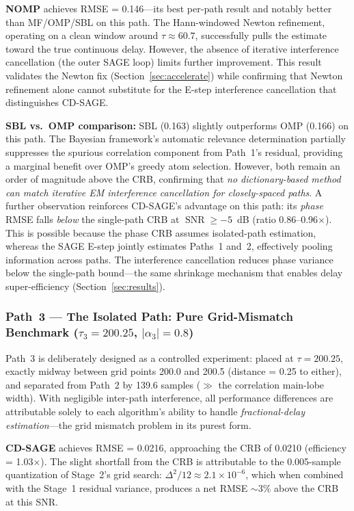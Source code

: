 \documentclass[a4paper,fleqn]{cas-dc}
\DeclareMathOperator{\SNR}{SNR}
\begin{document}
\textbf{NOMP} achieves RMSE = 0.146---its best per-path result and notably better than MF/OMP/SBL on this path. The Hann-windowed Newton refinement, operating on a clean window around $\tau \approx 60.7$, successfully pulls the estimate toward the true continuous delay. However, the absence of iterative interference cancellation (the outer SAGE loop) limits further improvement. This result validates the Newton fix (Section~\ref{sec:accelerate}) while confirming that Newton refinement alone cannot substitute for the E-step interference cancellation that distinguishes CD-SAGE.

\textbf{SBL vs.\ OMP comparison:} SBL (0.163) slightly outperforms OMP (0.166) on this path. The Bayesian framework's automatic relevance determination partially suppresses the spurious correlation component from Path~1's residual, providing a marginal benefit over OMP's greedy atom selection. However, both remain an order of magnitude above the CRB, confirming that \textit{no dictionary-based method can match iterative EM interference cancellation for closely-spaced paths}. A further observation reinforces CD-SAGE's advantage on this path: its \textit{phase} RMSE falls \textit{below} the single-path CRB at $\SNR \ge -5$~dB (ratio 0.86--0.96$\times$). This is possible because the phase CRB assumes isolated-path estimation, whereas the SAGE E-step jointly estimates Paths~1 and~2, effectively pooling information across paths. The interference cancellation reduces phase variance below the single-path bound---the same shrinkage mechanism that enables delay super-efficiency (Section~\ref{sec:results}).

\subsubsection{Path~3 --- The Isolated Path: Pure Grid-Mismatch Benchmark ($\tau_3 = 200.25$, $|\alpha_3| = 0.8$)}

Path~3 is deliberately designed as a controlled experiment: placed at $\tau = 200.25$, exactly midway between grid points 200.0 and 200.5 (distance = 0.25 to either), and separated from Path~2 by 139.6 samples ($\gg$ the correlation main-lobe width). With negligible inter-path interference, all performance differences are attributable solely to each algorithm's ability to handle \textit{fractional-delay estimation}---the grid mismatch problem in its purest form.

\textbf{CD-SAGE} achieves RMSE = 0.0216, approaching the CRB of 0.0210 (efficiency = 1.03$\times$). The slight shortfall from the CRB is attributable to the 0.005-sample quantization of Stage~2's grid search: $\Delta^2/12 \approx 2.1\times 10^{-6}$, which when combined with the Stage~1 residual variance, produces a net RMSE $\sim 3\%$ above the CRB at this SNR.
\end{document}
